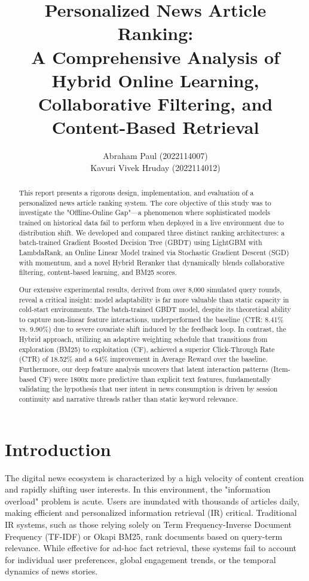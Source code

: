 \documentclass[11pt,a4paper]{article}
\title{\textbf{Personalized News Article Ranking: \\ A Comprehensive Analysis of Hybrid Online Learning, Collaborative Filtering, and Content-Based Retrieval}}
\author{ Abraham Paul (2022114007) \\ Kavuri Vivek Hruday (2022114012)}
\date{}
\begin{document}
\maketitle

\begin{abstract}
This report presents a rigorous design, implementation, and evaluation of a personalized news article ranking system. The core objective of this study was to investigate the "Offline-Online Gap"—a phenomenon where sophisticated models trained on historical data fail to perform when deployed in a live environment due to distribution shift. We developed and compared three distinct ranking architectures: a batch-trained Gradient Boosted Decision Tree (GBDT) using LightGBM with LambdaRank, an Online Linear Model trained via Stochastic Gradient Descent (SGD) with momentum, and a novel Hybrid Reranker that dynamically blends collaborative filtering, content-based learning, and BM25 scores.

Our extensive experimental results, derived from over 8,000 simulated query rounds, reveal a critical insight: model adaptability is far more valuable than static capacity in cold-start environments. The batch-trained GBDT model, despite its theoretical ability to capture non-linear feature interactions, underperformed the baseline (CTR: 8.41\% vs. 9.90\%) due to severe covariate shift induced by the feedback loop. In contrast, the Hybrid approach, utilizing an adaptive weighting schedule that transitions from exploration (BM25) to exploitation (CF), achieved a superior Click-Through Rate (CTR) of 18.52\% and a 64\% improvement in Average Reward over the baseline. Furthermore, our deep feature analysis uncovers that latent interaction patterns (Item-based CF) were 1800x more predictive than explicit text features, fundamentally validating the hypothesis that user intent in news consumption is driven by session continuity and narrative threads rather than static keyword relevance.
\end{abstract}

\newpage
\tableofcontents
\newpage

\section{Introduction}

The digital news ecosystem is characterized by a high velocity of content creation and rapidly shifting user interests. In this environment, the "information overload" problem is acute. Users are inundated with thousands of articles daily, making efficient and personalized information retrieval (IR) critical. Traditional IR systems, such as those relying solely on Term Frequency-Inverse Document Frequency (TF-IDF) or Okapi BM25, rank documents based on query-term relevance. While effective for ad-hoc fact retrieval, these systems fail to account for individual user preferences, global engagement trends, or the temporal dynamics of news stories.
\end{document}
